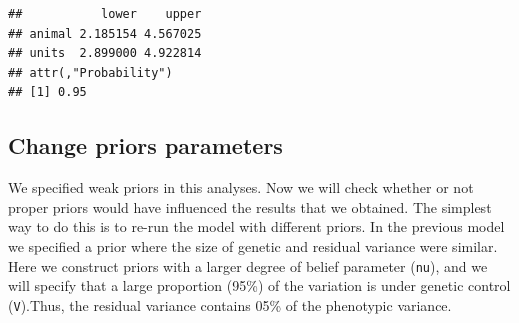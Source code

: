 \documentclass[
  12pt,
]{book}
\newenvironment{Shaded}{\begin{snugshade}}{\end{snugshade}}
\newcommand{\DataTypeTok}[1]{\textcolor[rgb]{0.13,0.29,0.53}{#1}}
\newcommand{\DecValTok}[1]{\textcolor[rgb]{0.00,0.00,0.81}{#1}}
\newcommand{\FloatTok}[1]{\textcolor[rgb]{0.00,0.00,0.81}{#1}}
\newcommand{\KeywordTok}[1]{\textcolor[rgb]{0.13,0.29,0.53}{\textbf{#1}}}
\newcommand{\NormalTok}[1]{#1}
\newcommand{\OperatorTok}[1]{\textcolor[rgb]{0.81,0.36,0.00}{\textbf{#1}}}
\newcommand{\OtherTok}[1]{\textcolor[rgb]{0.56,0.35,0.01}{#1}}
\newcommand{\StringTok}[1]{\textcolor[rgb]{0.31,0.60,0.02}{#1}}
\begin{document}
\begin{verbatim}
##           lower    upper
## animal 2.185154 4.567025
## units  2.899000 4.922814
## attr(,"Probability")
## [1] 0.95
\end{verbatim}

\hypertarget{change-priors-parameters}{%
\subsection{Change priors parameters}\label{change-priors-parameters}}

We specified weak priors in this analyses. Now we will check whether or not proper priors would have influenced the results that we obtained. The simplest way to do this is to re-run the model with different priors.
In the previous model we specified a prior where the size of genetic and residual variance were similar. Here we construct priors with a larger degree of belief parameter (\texttt{nu}), and we will specify that a large proportion (95\%) of the variation is under genetic control (\texttt{V}).Thus, the residual variance contains 05\% of the phenotypic variance.

\begin{Shaded}
\end{Shaded}
\end{document}

